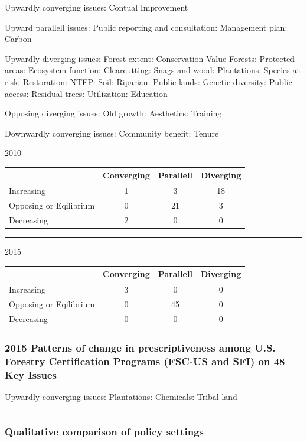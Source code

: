 \documentclass[
      12pt,
        ]{article}
\begin{document}
Upwardly converging issues: Contual Improvement

Upward parallell issues: Public reporting and consultation: Management
plan: Carbon

Upwardly diverging issues: Forest extent: Conservation Value Forests:
Protected areas: Ecosystem function: Clearcutting: Snags and wood:
Plantations: Species at risk: Restoration: NTFP: Soil: Riparian: Public
lands: Genetic diversity: Public access: Residual trees: Utilization:
Education

Opposing diverging issues: Old growth: Aesthetics: Training

Downwardly converging issues: Community benefit: Tenure

2010

\begin{longtable}[]{@{}lccc@{}}
\toprule
& Converging & Parallell & Diverging\tabularnewline
\midrule
\endhead
Increasing & 1 & 3 & 18\tabularnewline
Opposing or Eqilibrium & 0 & 21 & 3\tabularnewline
Decreasing & 2 & 0 & 0\tabularnewline
\bottomrule
\end{longtable}

\begin{center}\rule{0.5\linewidth}{\linethickness}\end{center}

2015

\begin{longtable}[]{@{}lccc@{}}
\toprule
& Converging & Parallell & Diverging\tabularnewline
\midrule
\endhead
Increasing & 3 & 0 & 0\tabularnewline
Opposing or Eqilibrium & 0 & 45 & 0\tabularnewline
Decreasing & 0 & 0 & 0\tabularnewline
\bottomrule
\end{longtable}

\subsubsection{2015 Patterns of change in prescriptiveness among U.S.
Forestry Certification Programs (FSC-US and SFI) on 48 Key
Issues}\label{patterns-of-change-in-prescriptiveness-among-u.s.-forestry-certification-programs-fsc-us-and-sfi-on-48-key-issues-1}

Upwardly converging issues: Plantations: Chemicals: Tribal land

\begin{center}\rule{0.5\linewidth}{\linethickness}\end{center}

\subsubsection{Qualitative comparison of policy
settings}\label{qualitative-comparison-of-policy-settings}
\end{document}
